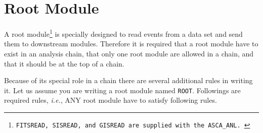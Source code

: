 \section{Root Module}\label{sec:root-module}
A root module\footnote{
\tt FITSREAD, SISREAD, and GISREAD are supplied with the ASCA\_ANL.
} is specially designed
to read events from a data set and send them to downstream modules.
Therefore it is required
that a root module have to exist in an analysis chain,
that only one root module are allowed in a chain,
and that it should be at the top of a chain.

Because of its special role in a chain
there are several additional rules in writing it.
Let us assume you are writing a root module named {\tt ROOT}.
Followings are required rules,
{\em i.e.},
ANY root module have to satisfy following rules.

